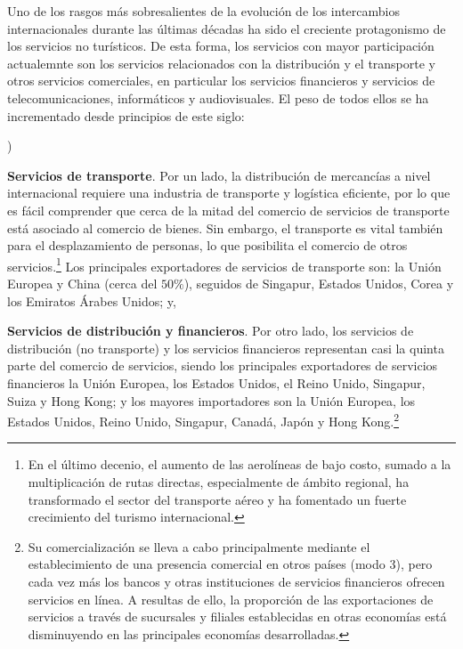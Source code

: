 \documentclass[10pt,a4paper]{article}
\newcounter{alphaitem}
\newenvironment{la}
      {\begin{list}{\alph{alphaitem})}{%
          \usecounter{alphaitem}%
          \setlength{\leftmargin}{1cm}%
          \setlength{\parskip}{3pt}%
          \setlength{\itemsep}{0pt}%
          \setlength{\parsep}{0pt}%
      }}
      {\end{list}}
\begin{document}
Uno de los rasgos más sobresalientes de la evolución de los intercambios internacionales durante las últimas décadas ha sido el creciente protagonismo de los servicios no turísticos. De esta forma, los servicios con mayor participación actualemnte son los servicios relacionados con la distribución y el transporte y otros servicios comerciales, en particular los servicios financieros y servicios de telecomunicaciones, informáticos y audiovisuales. El peso de todos ellos se ha incrementado desde principios de este siglo:
\begin{la}
    \item \textbf{Servicios de transporte}. Por un lado, la distribución de mercancías a nivel internacional requiere una industria de transporte y logística eficiente, por lo que es fácil comprender que cerca de la mitad del comercio de servicios de transporte está asociado al comercio de bienes. Sin embargo, el transporte es vital también para el desplazamiento de personas, lo que posibilita el comercio de otros servicios.\footnote{%
        En el último decenio, el aumento de las aerolíneas de bajo costo, sumado a la multiplicación de rutas directas, especialmente de ámbito regional, ha transformado el sector del transporte aéreo y ha fomentado un fuerte crecimiento del turismo internacional.
    } Los principales exportadores de servicios de transporte son: la Unión Europea y China (cerca del $50\%$), seguidos de Singapur, Estados Unidos, Corea y los Emiratos Árabes Unidos; y,
    \item \textbf{Servicios de distribución y financieros}. Por otro lado, los servicios de distribución (no transporte) y los servicios financieros representan casi la quinta parte del comercio de servicios, siendo los principales exportadores de servicios financieros la Unión Europea, los Estados Unidos, el Reino Unido, Singapur, Suiza y Hong Kong; y los mayores importadores son la Unión Europea, los Estados Unidos, Reino Unido, Singapur, Canadá, Japón y Hong Kong.\footnote{%
        Su comercialización se lleva a cabo principalmente mediante el establecimiento de una presencia comercial en otros países (modo 3), pero cada vez más los bancos y otras instituciones de servicios financieros ofrecen servicios en línea. A resultas de ello, la proporción de las exportaciones de servicios a través de sucursales y filiales establecidas en otras economías está disminuyendo en las principales economías desarrolladas.
    }
\end{la}
\end{document}
